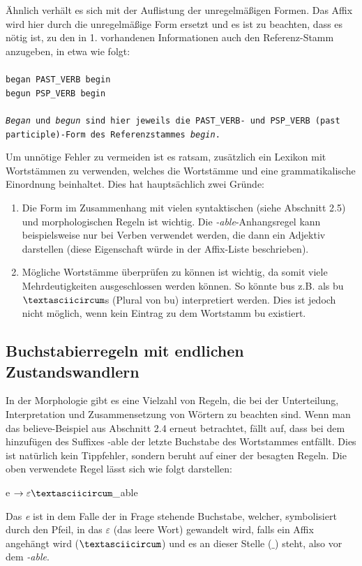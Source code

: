 \documentclass[12pt]{report}
\begin{document}
Ähnlich verhält es sich mit der Auflistung der unregelmäßigen Formen. Das Affix wird hier durch die unregelmäßige Form ersetzt und es ist zu beachten, dass es nötig ist, zu den in 1. vorhandenen Informationen auch den Referenz-Stamm anzugeben, in etwa wie folgt:
\\
\tt\\
began PAST\_VERB begin\\
begun PSP\_VERB begin\\
\rm\\
\textit{\glqq  Began\grqq{}} und \textit{\glqq  begun\grqq{}} sind hier jeweils die \glqq  PAST\_VERB\grqq{}- und \glqq  PSP\_VERB\grqq{} (past participle)-Form des Referenzstammes \textit{\glqq  begin\grqq{}}.

Um unnötige Fehler zu vermeiden ist es ratsam, zusätzlich ein Lexikon mit Wortstämmen zu verwenden, welches die Wortstämme und eine grammatikalische Einordnung beinhaltet. Dies hat hauptsächlich zwei Gründe: 

\begin{enumerate}
\item Die Form im Zusammenhang mit vielen syntaktischen (siehe Abschnitt 2.5) und morphologischen Regeln ist wichtig. Die \textit{\glqq  -able\grqq{}}-Anhangsregel kann beispielsweise nur bei Verben verwendet werden, die dann ein Adjektiv darstellen (diese Eigenschaft würde in der Affix-Liste beschrieben).
\item Mögliche Wortstämme überprüfen zu können ist wichtig, da somit viele Mehrdeutigkeiten ausgeschlossen werden können. So könnte \glqq  bus\grqq{} z.B. als \glqq  bu$\textasciicircum$s\grqq{} (Plural von \glqq  bu\grqq{}) interpretiert werden. Dies ist jedoch nicht möglich, wenn kein Eintrag zu dem Wortstamm \glqq  bu\grqq{} existiert. 
\end{enumerate}

\subsection{Buchstabierregeln mit endlichen\\ Zustandswandlern}
In der Morphologie gibt es eine Vielzahl von Regeln, die bei der Unterteilung, Interpretation und Zusammensetzung von Wörtern zu beachten sind. Wenn man das \glqq  believe\grqq{}-Beispiel aus Abschnitt 2.4 erneut betrachtet, fällt auf, dass bei dem hinzufügen des Suffixes \glqq  -able\grqq{} der letzte Buchstabe des Wortstammes entfällt. Dies ist natürlich kein Tippfehler, sondern beruht auf einer der besagten Regeln. Die oben verwendete Regel lässt sich wie folgt darstellen:
\tt
\begin{center}
e $\rightarrow \varepsilon \textasciicircum \_$able
\end{center}
\rm
Das \textit{e} ist in dem Falle der in Frage stehende Buchstabe, welcher, symbolisiert durch den Pfeil, in das $\varepsilon$ (das leere Wort) gewandelt wird, falls ein Affix angehängt wird ($\textasciicircum$) und es an dieser Stelle ($\_$) steht, also vor dem \textit{\glqq  -able\grqq{}}.
\end{document}
